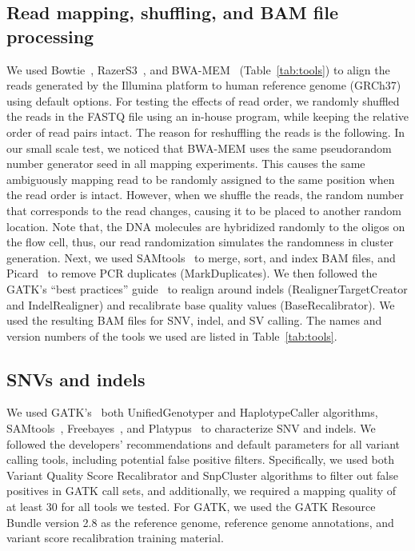 \documentclass[10pt,a4paper]{article}
\begin{document}
\subsection*{Read mapping, shuffling, and BAM file processing}
We used  Bowtie~\cite{Langmead2009}, RazerS3~\cite{Weese2012}, and BWA-MEM~\cite{Li2009a,Li2013} %
(Table~\ref{tab:tools}) 
to align the reads generated by the Illumina 
platform to human reference genome (GRCh37) using default options. For testing the effects of read order, we randomly 
shuffled the reads in the FASTQ file using an in-house program, while keeping the relative order of read pairs intact.
The reason for reshuffling the reads is the following. In our small scale test, we noticed that BWA-MEM uses the same pseudorandom number generator seed in all mapping experiments. This
causes the same ambiguously mapping read to be randomly assigned to the same position when the read order is intact. However, when we shuffle the reads, the random number that corresponds to 
the read changes, causing it to be placed to another random location. Note that, the DNA molecules are hybridized randomly to the oligos on the flow cell, thus, our read randomization simulates the randomness
in cluster generation.
Next, we used SAMtools~\cite{Li2009b} to merge, sort, and index BAM files, and Picard~\cite{picard} to remove PCR duplicates (MarkDuplicates).
We then followed the GATK's ``best practices'' guide~\cite{VanderAuwera2013} to
realign around indels (RealignerTargetCreator and IndelRealigner) and recalibrate base quality values (BaseRecalibrator). We used the 
resulting BAM files for SNV, indel, and SV calling. The names and version numbers of the tools we used are listed in Table~\ref{tab:tools}.


\subsection*{SNVs and indels}

We used GATK's~\cite{DePristo2011} both UnifiedGenotyper and HaplotypeCaller algorithms, SAMtools~\cite{Li2009b}, Freebayes~\cite{Garrison2012}, and Platypus~\cite{Rimmer2014} to characterize
SNV and indels. We followed the developers' recommendations and default parameters for all variant calling tools, including potential false positive filters. 
Specifically, we used both Variant Quality Score Recalibrator and SnpCluster algorithms to filter out false positives in GATK call sets, and additionally, 
we required a mapping quality of at least 30 for all tools we tested.
For GATK, we used the GATK Resource Bundle version 2.8 as the reference genome, reference genome annotations, and variant score recalibration training material.
\end{document}
